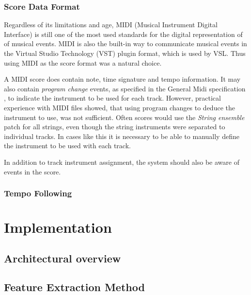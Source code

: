 
\subsection{Score Data Format}

Regardless of its limitations and age,
MIDI (Musical Instrument Digital Interface)
is still one of the most used standards
for the digital representation of of musical events.
MIDI is also the built-in way to communicate musical events
in the Virtual Studio Technology (VST) plugin format,
which is used by VSL.
Thus using MIDI as the score format was a natural choice.

A MIDI score does contain
note, time signature and tempo information.
It may also contain \textit{program change} events,
as specified in the General Midi specification \cite{},
to indicate the instrument to be used for each track.
However, practical experience with MIDI files showed,
that using program changes to deduce the instrument to use,
was not sufficient.
Often scores would use the
\textit{String ensemble} patch for all strings,
even though the string instruments were separated to individual tracks.
In cases like this it is necessary to be able to manually
define the instrument to be used with each track.

In addition to track instrument assignment,
the system should also be aware of events in the score.

\subsection{Tempo Following}



\chapter{Implementation}
\label{chapter:implementation}

\section{Architectural overview}

\section{Feature Extraction Method}

